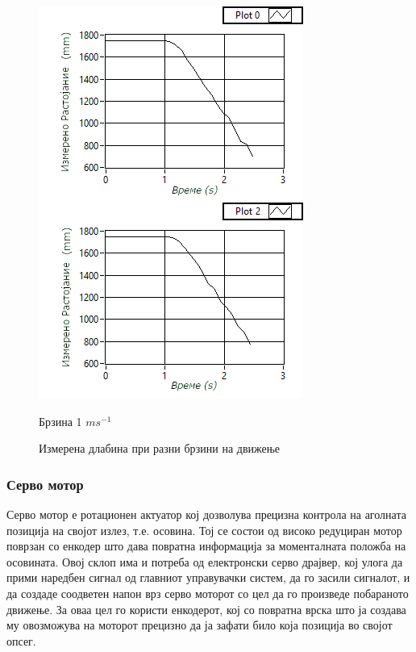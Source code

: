 \documentclass[11pt]{article}
\begin{document}
\begin{figure}[H]
\begin{minipage}{0.45\linewidth}
          \includegraphics[width = \textwidth]{./images/speed_composite_10_mk.png}
          \caption{Брзина 1 $ms^{-1}$}
        \end{minipage}
        \caption{Измерена длабина при разни брзини на движење}
        \label{fig:composites}
      \end{figure}

    \subsubsection{Серво мотор}
      Серво мотор е ротационен актуатор кој дозволува прецизна контрола на аголната позиција на својот излез, т.е. осовина. Тој се состои од високо редуциран мотор поврзан со енкодер што дава повратна информација за моменталната положба на осовината. Овој склоп има и потреба од електронски серво драјвер, кој улога да прими наредбен сигнал од главниот управувачки систем, да го засили сигналот, и да создаде соодветен напон врз серво моторот со цел да го произведе побараното движење. За оваа цел го користи енкодерот, кој со повратна врска што ја создава му овозможува на моторот прецизно да ја зафати било која позиција во својот опсег.
\end{document}
